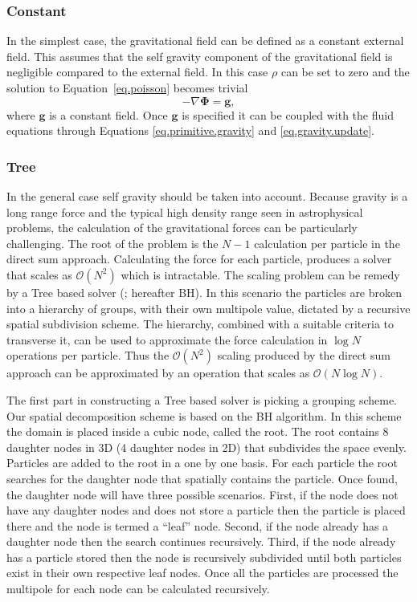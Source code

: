 \subsubsection{Constant}
In the simplest case, the gravitational field can be defined as a constant external field. This assumes
that the self gravity component of the gravitational field is negligible compared to the external field.
In this case $\rho$ can be set to zero and the solution to Equation~\ref{eq.poisson} becomes trivial
\begin{equation}
	-\nabla\mathbf{\Phi} = \mathbf{g},
\end{equation}
where $\mathbf{g}$ is a constant field. Once $\mathbf{g}$ is specified it can be coupled with the fluid
equations through Equations \ref{eq.primitive.gravity} and \ref{eq.gravity.update}.

\subsubsection{Tree}
In the general case self gravity should be taken into account. Because 
gravity is a long range force and the typical high density range
seen in astrophysical problems, the calculation of the gravitational forces
can be particularly challenging. The root of the problem
is the $N-1$ calculation per particle in the direct sum approach. Calculating the force for
each particle, produces a solver that scales as $\mathcal{O}(N^2)$ which is intractable.
The scaling problem can be remedy by a Tree based solver (\cite{Barnes1986}; hereafter BH).
In this scenario the particles
are broken into a hierarchy of groups, with their own multipole value, dictated by a 
recursive spatial subdivision scheme. The hierarchy, combined with a suitable
criteria to transverse it, can be used to approximate the force calculation in
$\log{}N$ operations per particle. Thus the $\mathcal{O}(N^2)$ scaling produced by the direct sum
approach can be approximated by an operation that scales as $\mathcal{O}(N\log{}N)$.

The first part in constructing a Tree based solver is picking a grouping scheme.
Our spatial decomposition scheme is based on the BH algorithm. In this scheme
the domain is placed inside a cubic node, called the root. The root contains 8 daughter nodes in
3D (4 daughter nodes in 2D) that
subdivides the space evenly. Particles are added to the root in a one by one basis. For each particle
the root searches for the daughter node that spatially contains the particle. Once found, the daughter
node will have three possible scenarios. First, if the node does not have any daughter nodes and does
not store a particle then the particle is placed there and the node is termed a ``leaf'' node.
Second, if the node already has a daughter node then the search continues recursively. Third,
if the node already has a particle stored then the node is recursively subdivided until
both particles exist in their own respective leaf nodes. Once all the particles are processed
the multipole for each node can be calculated recursively.

